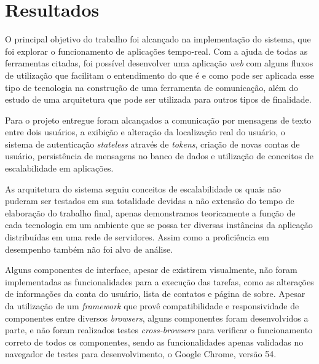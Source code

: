\chapter{Resultados}
O principal objetivo do trabalho foi alcançado na implementação do sistema, que foi explorar o funcionamento de aplicações tempo-real. Com a ajuda de todas as ferramentas citadas, foi possível desenvolver uma aplicação \textit{web} com alguns fluxos de utilização que facilitam o entendimento do que é e como pode ser aplicada esse tipo de tecnologia na construção de uma ferramenta de comunicação, além do estudo de uma arquitetura que pode ser utilizada para outros tipos de finalidade. 

Para o projeto entregue foram alcançados a comunicação por mensagens de texto entre dois usuários, a exibição e alteração da localização real do usuário, o sistema de autenticação \textit{stateless} através de \textit{tokens}, criação de novas contas de usuário, persistência de mensagens no banco de dados e utilização de conceitos de escalabilidade em aplicações. 

As arquitetura do sistema seguiu conceitos de escalabilidade os quais não puderam ser testados em sua totalidade devidas a não extensão do tempo de elaboração do trabalho final, apenas demonstramos teoricamente a função de cada tecnologia em um ambiente que se possa ter diversas instâncias da aplicação distribuídas em uma rede de servidores. Assim como a proficiência em desempenho também não foi alvo de análise.

Alguns componentes de interface, apesar de existirem visualmente, não foram implementadas as funcionalidades para a execução das tarefas, como as alterações de informações da conta do usuário, lista de contatos e página de sobre. Apesar da utilização de um \textit{framework} que provê compatibilidade e responsividade de componentes entre diversos \textit{browsers}, alguns componentes foram desenvolvidos a parte, e não foram realizados testes \textit{cross-browsers} para verificar o funcionamento correto de todos os componentes, sendo as funcionalidades apenas validadas no navegador de testes para desenvolvimento, o Google Chrome, versão 54.